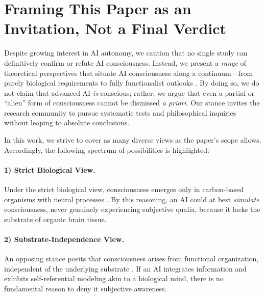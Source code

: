 \documentclass[12pt]{article}
\begin{document}


\section{Framing This Paper as an Invitation, Not a Final Verdict}
\label{sec:invitation}

Despite growing interest in AI autonomy, we caution that no single study can definitively confirm or refute AI consciousness. 
Instead, we present a \emph{range} of theoretical perspectives that situate AI consciousness along a continuum—from purely biological requirements to fully functionalist outlooks \cite{Chalmers1996,Tononi2004}.
By doing so, we do not claim that advanced AI \emph{is} conscious; rather, we argue that even a partial or “alien” form of consciousness cannot be dismissed \emph{a priori}.
Our stance invites the research community to pursue systematic tests and philosophical inquiries without leaping to absolute conclusions.

\par
In this work, we strive to cover as many diverse views as the paper’s scope allows. 
Accordingly, the following spectrum of possibilities is highlighted:

\paragraph{1) Strict Biological View.}
Under the strict biological view, consciousness emerges only in carbon-based organisms with neural processes \cite{Searle1992}. 
By this reasoning, an AI could at best \emph{simulate} consciousness, never genuinely experiencing subjective qualia, because it lacks the substrate of organic brain tissue.

\paragraph{2) Substrate-Independence View.}
An opposing stance posits that consciousness arises from functional organization, independent of the underlying substrate \cite{Chalmers1996,Baars1988}. 
If an AI integrates information and exhibits self-referential modeling akin to a biological mind, there is no fundamental reason to deny it subjective awareness.
\end{document}
